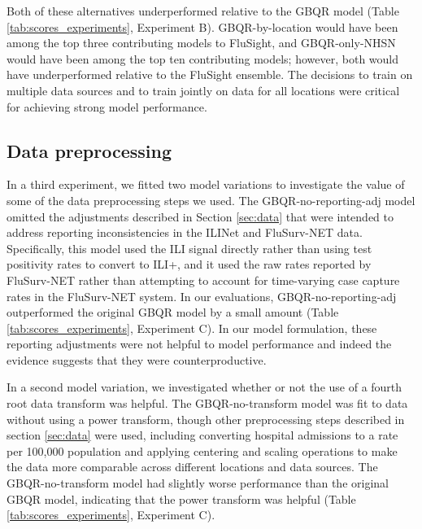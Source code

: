 \documentclass{article}\usepackage[]{graphicx}\usepackage[]{xcolor}
\begin{document}
Both of these alternatives underperformed relative to the GBQR model (Table \ref{tab:scores_experiments}, Experiment B). GBQR-by-location would have been among the top three contributing models to FluSight, and GBQR-only-NHSN would have been among the top ten contributing models; however, both would have underperformed relative to the FluSight ensemble. The decisions to train on multiple data sources and to train jointly on data for all locations were critical for achieving strong model performance.

\subsection{Data preprocessing}
\label{sec:post-hoc-preprocessing}

In a third experiment, we fitted two model variations to investigate the value of some of the data preprocessing steps we used.  The GBQR-no-reporting-adj model omitted the adjustments described in Section \ref{sec:data} that were intended to address reporting inconsistencies in the ILINet and FluSurv-NET data. Specifically, this model used the ILI signal directly rather than using test positivity rates to convert to ILI+, and it used the raw rates reported by FluSurv-NET rather than attempting to account for time-varying case capture rates in the FluSurv-NET system. In our evaluations, GBQR-no-reporting-adj outperformed the original GBQR model by a small amount (Table \ref{tab:scores_experiments}, Experiment C). In our model formulation, these reporting adjustments were not helpful to model performance and indeed the evidence suggests that they were counterproductive.

In a second model variation, we investigated whether or not the use of a fourth root data transform was helpful. The GBQR-no-transform model was fit to data without using a power transform, though other preprocessing steps described in section \ref{sec:data} were used, including converting hospital admissions to a rate per 100,000 population and applying centering and scaling operations to make the data more comparable across different locations and data sources. The GBQR-no-transform model had slightly worse performance than the original GBQR model, indicating that the power transform was helpful (Table \ref{tab:scores_experiments}, Experiment C).
\end{document}
